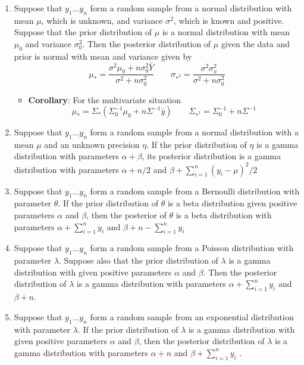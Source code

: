 \documentclass[letterpaper]{article}
\begin{document}
\begin{enumerate}
\item Suppose that $y_1...y_n$ form a random sample from a normal distribution with mean $\mu$, which is unknown, and variance $\sigma^2$, which is known and positive. Suppose that the prior distribution of $\mu$ is a normal distribution with mean $\mu_0$ and variance $\sigma_{0}^2$. Then the posterior distribution of $\mu$ given the data and prior is normal with mean and variance given by
\begin{equation*}
\mu_{*}=\frac{\sigma^2\mu_0+n\sigma_0^2 \bar{Y}}{\sigma^2 + n\sigma_0^2} \qquad \sigma_{*^2}=\frac{\sigma^2\sigma_o^2}{\sigma^2+n\sigma_0^2}
\end{equation*}
\begin{itemize}
\item \textbf{Corollary}: For the multivariate situation
\begin{equation}
\mu_{*}=\Sigma_*\left( \Sigma_{0}^{-1}\mu_0+n\Sigma^{-1}\bar{y} \right) \qquad \Sigma_{*^1}=\Sigma_0^{-1}+n\Sigma^{-1}
\end{equation}
\end{itemize}
\item Suppose that $y_1...y_n$ form a random sample from a normal distribution with a mean $\mu$ and an unknown precision $\eta$. If the prior distribution of $\eta$ is a gamma distribution with parameters $\alpha + \beta$, its posterior distribution is a gamma distribution with parameters $\alpha + n/2$ and $ \beta + \sum_{i=1}^{n} (y_i-\mu)^2/2 $

\item Suppose that $y_1...y_n$ form a random sample from a Bernoulli distribution with parameter $\theta$. If the prior distribution of $\theta$ is a beta distribution given positive parameters $\alpha$ and $\beta$, then the posterior of $\theta$ is a beta distribution with parameters $\alpha + \sum_{i=1}^{n} y_i$ and $\beta + n - \sum_{i=1}^{n} y_i$ 

\item Suppose that $y_1...y_n$ form a random sample from a Poisson distribution with parameter $\lambda$. Suppose also that the prior distribution of $\lambda$ is a gamma distribution with given positive parameters $\alpha$ and $\beta$. Then the posterior distribution
of $\lambda$ is a gamma distribution with parameters $\alpha + \sum_{i=1}^{n}y_i$ and $\beta + n$.

\item Suppose that $y_1...y_n$ form a random sample from an exponential
distribution with parameter $\lambda$. If the prior distribution of $\lambda$ is a gamma distribution with given positive parameters $\alpha$ and $\beta$, then the posterior distribution of $\lambda$ is a gamma distribution with parameters $\alpha + n$ and $\beta + \sum_{i=1}^n y_i$ .


\end{enumerate}
\end{document}
